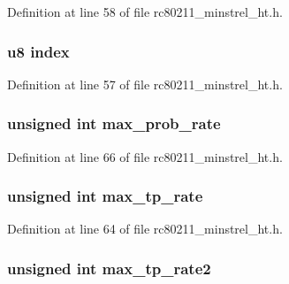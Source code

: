 Definition at line 58 of file rc80211\-\_\-minstrel\-\_\-ht.\-h.

\hypertarget{structminstrel__mcs__group__data_aa93030ce4aadb2b3f398bfd4a3eda31b}{
\subsubsection[{index}]{\setlength{\rightskip}{0pt plus 5cm}u8 index}}\label{structminstrel__mcs__group__data_aa93030ce4aadb2b3f398bfd4a3eda31b}


Definition at line 57 of file rc80211\-\_\-minstrel\-\_\-ht.\-h.

\hypertarget{structminstrel__mcs__group__data_a4a4625871f05851116acae11b392a957}{
\subsubsection[{max\-\_\-prob\-\_\-rate}]{\setlength{\rightskip}{0pt plus 5cm}unsigned int max\-\_\-prob\-\_\-rate}}\label{structminstrel__mcs__group__data_a4a4625871f05851116acae11b392a957}


Definition at line 66 of file rc80211\-\_\-minstrel\-\_\-ht.\-h.

\hypertarget{structminstrel__mcs__group__data_ae61b14461f5cfea710f666fe40906493}{
\subsubsection[{max\-\_\-tp\-\_\-rate}]{\setlength{\rightskip}{0pt plus 5cm}unsigned int max\-\_\-tp\-\_\-rate}}\label{structminstrel__mcs__group__data_ae61b14461f5cfea710f666fe40906493}


Definition at line 64 of file rc80211\-\_\-minstrel\-\_\-ht.\-h.

\hypertarget{structminstrel__mcs__group__data_aaa4f3e0147c91173f7dd6d86b82ba0ee}{
\subsubsection[{max\-\_\-tp\-\_\-rate2}]{\setlength{\rightskip}{0pt plus 5cm}unsigned int max\-\_\-tp\-\_\-rate2}}\label{structminstrel__mcs__group__data_aaa4f3e0147c91173f7dd6d86b82ba0ee}


